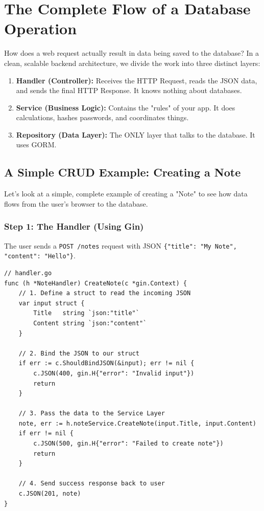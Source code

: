 \documentclass[11pt,a4paper]{article}
\begin{document}
\section{The Complete Flow of a Database Operation}
How does a web request actually result in data being saved to the database? In a clean, scalable backend architecture, we divide the work into three distinct layers:
\begin{enumerate}
    \item \textbf{Handler (Controller):} Receives the HTTP Request, reads the JSON data, and sends the final HTTP Response. It knows nothing about databases.
    \item \textbf{Service (Business Logic):} Contains the "rules" of your app. It does calculations, hashes passwords, and coordinates things.
    \item \textbf{Repository (Data Layer):} The ONLY layer that talks to the database. It uses GORM.
\end{enumerate}

\subsection{A Simple CRUD Example: Creating a Note}
Let's look at a simple, complete example of creating a "Note" to see how data flows from the user's browser to the database.

\subsubsection{Step 1: The Handler (Using Gin)}
The user sends a \texttt{POST /notes} request with JSON \texttt{\{"title": "My Note", "content": "Hello"\}}.
\begin{lstlisting}
// handler.go
func (h *NoteHandler) CreateNote(c *gin.Context) {
    // 1. Define a struct to read the incoming JSON
    var input struct {
        Title   string `json:"title"`
        Content string `json:"content"`
    }

    // 2. Bind the JSON to our struct
    if err := c.ShouldBindJSON(&input); err != nil {
        c.JSON(400, gin.H{"error": "Invalid input"})
        return
    }

    // 3. Pass the data to the Service Layer
    note, err := h.noteService.CreateNote(input.Title, input.Content)
    if err != nil {
        c.JSON(500, gin.H{"error": "Failed to create note"})
        return
    }

    // 4. Send success response back to user
    c.JSON(201, note)
}
\end{lstlisting}
\end{document}
